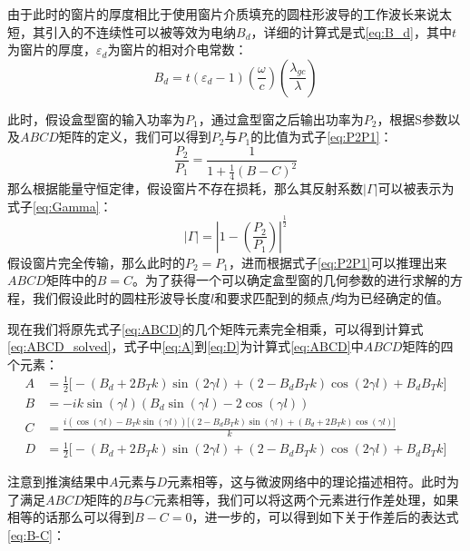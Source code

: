\documentclass[master]{thesis-uestc}
\begin{document}
由于此时的窗片的厚度相比于使用窗片介质填充的圆柱形波导的工作波长来说太短，其引入的不连续性可以被等效为电纳$B_{d}$，详细的计算式是式\ref{eq:B_d}，其中$t$为窗片的厚度，$\varepsilon_d$为窗片的相对介电常数：
\begin{equation}\label{eq:B_d}
    B_{d} = t (\varepsilon_d - 1) \left( \frac{\omega}{c} \right) \left( \frac{\lambda_{gc}}{\lambda} \right)
\end{equation}

此时，假设盒型窗的输入功率为$P_{1}$，通过盒型窗之后输出功率为$P_{2}$，根据S参数以及$ABCD$矩阵的定义，我们可以得到$P_{2}$与$P_{1}$的比值为式子\ref{eq:P2P1}：
\begin{equation}\label{eq:P2P1}
    \frac{P_{2}}{P_{1}} = \frac{1}{1+\frac{1}{4} (B-C)^2}
\end{equation}
那么根据能量守恒定律，假设窗片不存在损耗，那么其反射系数$|\Gamma|$可以被表示为式子\ref{eq:Gamma}：
\begin{equation}\label{eq:Gamma}
    |\Gamma| = \left| 1 - \left( \frac{P_{2}}{P_{1}} \right) \right|^{\frac{1}{2}}
\end{equation}
假设窗片完全传输，那么此时的$P_{2}=P_{1}$，进而根据式子\ref{eq:P2P1}可以推理出来$ABCD$矩阵中的$B=C$。为了获得一个可以确定盒型窗的几何参数的进行求解的方程，我们假设此时的圆柱形波导长度$l$和要求匹配到的频点$f$均为已经确定的值。

现在我们将原先式子\ref{eq:ABCD}的几个矩阵元素完全相乘，可以得到计算式\ref{eq:ABCD_solved}，式子中\ref{eq:A}到\ref{eq:D}为计算式\ref{eq:ABCD}中$ABCD$矩阵的四个元素：
\begin{subequations}\label{eq:ABCD_solved}
    \begin{align}
        A &= \frac{1}{2} \big[-(B_d + 2 B_T k) \sin(2\gamma l) + (2 - B_d B_T k)\cos(2\gamma l) + B_d B_T k \big] \label{eq:A} \\
        B &= -i k \sin(\gamma l) (B_d \sin(\gamma l) - 2 \cos(\gamma l)) \label{eq:B} \\
        C &= \frac{i (\cos(\gamma l) - B_T k \sin(\gamma l)) \big[(2 - B_d B_T k)\sin(\gamma l) + (B_d + 2 B_T k)\cos(\gamma l)\big]}{k} \label{eq:C} \\
        D &= \frac{1}{2} \big[-(B_d + 2 B_T k) \sin(2\gamma l) + (2 - B_d B_T k)\cos(2\gamma l) + B_d B_T k \big] \label{eq:D}
    \end{align}
\end{subequations}

注意到推演结果中$A$元素与$D$元素相等，这与微波网络中的理论描述相符。此时为了满足$ABCD$矩阵的$B$与$C$元素相等，我们可以将这两个元素进行作差处理，如果相等的话那么可以得到$B-C=0$，进一步的，可以得到如下关于作差后的表达式\ref{eq:B-C}：
\end{document}
